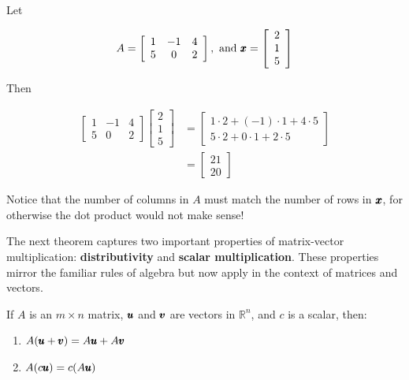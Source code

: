\begin{example} Let

\[
A=\left[\begin{array}{ccc}
1 & -1 & 4 \\
5 & 0 & 2
\end{array}\right], \text { and } \pmb{x}=\left[\begin{array}{l}
2 \\
1 \\
5
\end{array}\right]
\]

Then

\[
\begin{aligned}
{\left[\begin{array}{ccc}
1 & -1 & 4 \\
5 & 0 & 2
\end{array}\right]\left[\begin{array}{l}
2 \\
1 \\
5
\end{array}\right] } & =\left[\begin{array}{c}
1 \cdot 2+(-1) \cdot 1+4 \cdot 5 \\
5 \cdot 2+0 \cdot 1+2 \cdot 5
\end{array}\right] \\
& =\left[\begin{array}{c}
21 \\
20
\end{array}\right]
\end{aligned}
\]
\end{example}

Notice that the number of columns in $A$ must match the number of rows in $\pmb{x}$, for otherwise the dot product would not make sense!

The next theorem captures two important properties of matrix-vector multiplication: \textbf{distributivity} and \textbf{scalar multiplication}. These properties mirror the familiar rules of algebra but now apply in the context of matrices and vectors.

\begin{theorem}
If \( A \) is an \( m \times n \) matrix, \( \pmb{u} \) and \( \pmb{v} \) are vectors in \( \mathbb{R}^n \), and \( c \) is a scalar, then:

\begin{enumerate}[label=(\alph*)]
    \item \( A(\pmb{u} + \pmb{v}) = A \pmb{u} + A \pmb{v} \)  


    \item \( A(c \pmb{u}) = c(A \pmb{u}) \)  

\end{enumerate}
\end{theorem}

